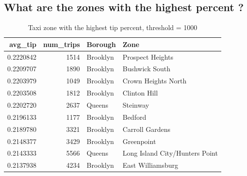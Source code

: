 \documentclass[12pt,twoside]{reedthesis}
\newenvironment{Shaded}{\begin{snugshade}}{\end{snugshade}}
\newcommand{\KeywordTok}[1]{\textcolor[rgb]{0.13,0.29,0.53}{\textbf{#1}}}
\newcommand{\DataTypeTok}[1]{\textcolor[rgb]{0.13,0.29,0.53}{#1}}
\newcommand{\DecValTok}[1]{\textcolor[rgb]{0.00,0.00,0.81}{#1}}
\newcommand{\StringTok}[1]{\textcolor[rgb]{0.31,0.60,0.02}{#1}}
\newcommand{\CommentTok}[1]{\textcolor[rgb]{0.56,0.35,0.01}{\textit{#1}}}
\newcommand{\OperatorTok}[1]{\textcolor[rgb]{0.81,0.36,0.00}{\textbf{#1}}}
\newcommand{\NormalTok}[1]{#1}
\theoremstyle{definition}
\theoremstyle{definition}
\theoremstyle{definition}
\theoremstyle{remark}
\begin{document}
\subsection{What are the zones with the highest percent
?}\label{what-are-the-zones-with-the-highest-percent}
\begin{Shaded}
\end{Shaded}
\begin{table}

\caption{\label{tab:unnamed-chunk-18}Taxi zone with the highest tip percent, threshold = 1000}
\centering
\begin{tabular}[t]{r|r|l|l}
\hline
avg\_tip & num\_trips & Borough & Zone\\
\hline
0.2220842 & 1514 & Brooklyn & Prospect Heights\\
\hline
0.2209707 & 1890 & Brooklyn & Bushwick South\\
\hline
0.2203979 & 1049 & Brooklyn & Crown Heights North\\
\hline
0.2203508 & 1812 & Brooklyn & Clinton Hill\\
\hline
0.2202720 & 2637 & Queens & Steinway\\
\hline
0.2196133 & 1177 & Brooklyn & Bedford\\
\hline
0.2189780 & 3321 & Brooklyn & Carroll Gardens\\
\hline
0.2148377 & 3429 & Brooklyn & Greenpoint\\
\hline
0.2143333 & 5566 & Queens & Long Island City/Hunters Point\\
\hline
0.2137938 & 4234 & Brooklyn & East Williamsburg\\
\hline
\end{tabular}
\end{table}
\end{document}
